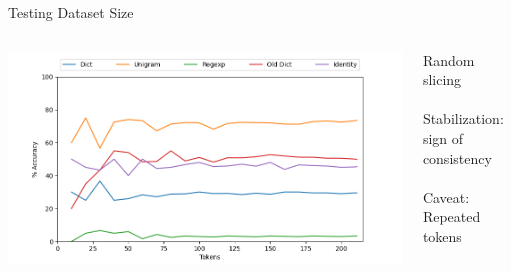 \documentclass[aspectratio=169,xcolor=dvipsnames]{beamer}
\begin{document}
\begin{frame}[t]{Testing Dataset Size}
\ \\
    \begin{columns}
        \begin{column}{0.75\textwidth}
           \includegraphics[width=1\textwidth]{accuracy_over_time_v3.png}
        \end{column}
        \begin{column}{0.35\textwidth}
                Random slicing \\ \ \\
                Stabilization: sign of consistency \\ \ \\
                Caveat: Repeated tokens
        \end{column}
    \end{columns} 

\end{frame}
\end{document}

